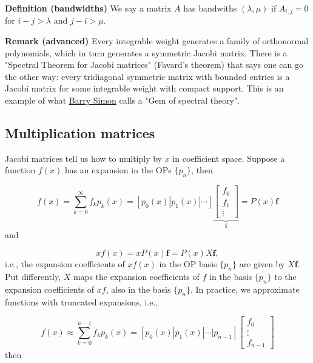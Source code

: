 \documentclass[12pt,landscape]{article}
\begin{document}
{\textbf{Definition (bandwidths)} We say a matrix $A$ has bandwiths $(\lambda, \mu)$ if $A_{i,j} = 0$ for $i-j > \lambda$ and $j-i > \mu$. 

\textbf{Remark (advanced)} Every integrable weight generates a family of orthonormal polynomials, which in turn generates a symmetric Jacobi matrix. There is a "Spectral Theorem for Jacobi matrices" (Favard's theorem) that says one can go the other way: every tridiagonal symmetric matrix with bounded entries is a Jacobi matrix for some integrable weight with compact support. This is an example of what \href{https://en.wikipedia.org/wiki/Barry_Simon}{Barry Simon} calls a "Gem of spectral theory".

\subsection{Multiplication matrices}
Jacobi matrices tell us how to multiply by $x$ in coefficient space.  Suppose a function $f(x)$ has an expansion in the OPs $\{ p_n \}$, then

\[
f(x) = \sum_{k = 0}^{\infty} f_k p_k(x) = [p_0(x) | p_1(x) | \ensuremath{\cdots}]\underbrace{\begin{bmatrix}
f_0 \\
f_1 \\
\vdots
\end{bmatrix}}_{\mathbf{f}} = P(x)\mathbf{f}
\]
and

\[
xf(x) = xP(x)\mathbf{f} = P(x) X\mathbf{f},
\]
i.e., the expansion coefficients of $xf(x)$ in the OP basis $\{ p_n \}$ are given by $X\mathbf{f}$. Put differently, $X$ maps the expansion coefficients of $f$ in the basis $\{ p_n \}$ to the expansion coefficients of $xf$, also in the basis $\{ p_n \}$.  In practice, we approximate functions with truncated expansions, i.e.,

\[
f(x) \approx \sum_{k = 0}^{n-1} f_k p_k(x) = [p_0(x) | p_1(x) | \ensuremath{\cdots} | p_{n-1}]\begin{bmatrix}
f_0 \\
\vdots \\
f_{n-1}
\end{bmatrix}
\]
then


}
\end{document}
